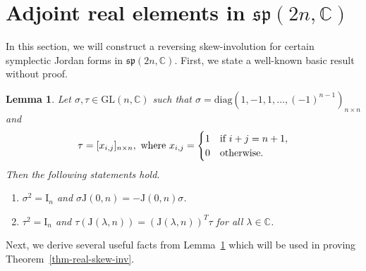 \documentclass[11pt,reqno]{amsart}
\numberwithin{equation}{section}
\newtheorem{lemma}[theorem]{Lemma}
\theoremstyle{definition}
\def\C{\mathbb C}
\def\C{\mathbb {C}}
\newcommand{\thmref}[1]{Theorem~\ref{#1}}
\newcommand{\lemref}[1]{Lemma~\ref{#1}}
\begin{document}
\section{Adjoint real elements in $\mathfrak{sp}(2n,\mathbb{C})$}\label{sec-adjoint-real}
In this section, we will construct a reversing skew-involution for certain symplectic Jordan forms in $\mathfrak{sp}(2n,\mathbb{C})$.  First, we state a
well-known basic result without proof.
\begin{lemma}  \label{lem-basic-inv}
	Let  $\sigma, \tau \in \mathrm{GL}(n,\C)$ such that  $ \sigma= \mathrm{diag}(1, -1, 1, \dots, (-1)^{n-1})_{n \times n}$ and 
	\begin{equation}
		\tau=[x_{i,j}]_{n \times n}, \hbox{ where }	 x_{i,j} = \begin{cases}
			1 & \text{if $i+j =n+1$},\\
			0 & \text{otherwise}.
		\end{cases}
	\end{equation}
	Then the following statements hold.
	\begin{enumerate}
		
		\item $\sigma^2= \mathrm{I}_{n}$ and  $\sigma \mathrm{J}(0, n) = - \mathrm{J}(0, n)   \sigma$. 
		\item $\tau ^2 = \mathrm{I}_{n}$ and $\tau  (\mathrm{J}(\lambda, n)) = (\mathrm{J}(\lambda, n))^{T}\tau $ for all $\lambda \in \C$.
	\end{enumerate}
\end{lemma}

Next, we derive several useful facts from \lemref{lem-basic-inv} which will be used in proving \thmref{thm-real-skew-inv}.
\end{document}
